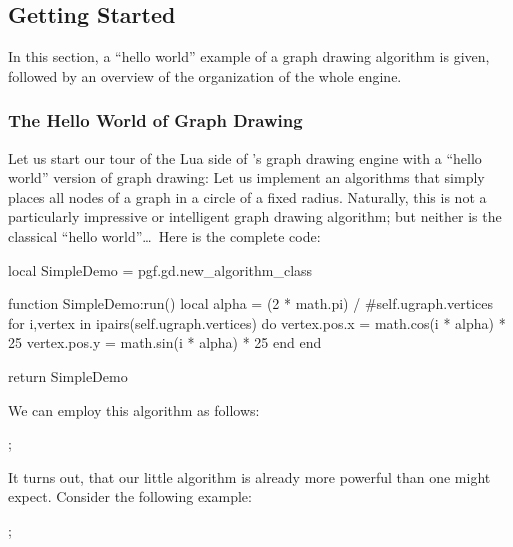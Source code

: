 \subsection{Getting Started}

In this section, a ``hello world'' example of a graph
drawing algorithm  is given, followed by an overview of the
organization of the whole engine.



\subsubsection{The Hello World of Graph Drawing}

Let us start our tour of the Lua side of \tikzname's graph drawing
engine with a ``hello world'' version of graph drawing: Let us
implement an algorithms that simply places all nodes of a graph in a
circle of a fixed radius. Naturally, this is not a particularly
impressive or intelligent graph drawing algorithm; but neither is the
classical ``hello world''\dots\ Here is the complete code:

\begin{codeexample}
local SimpleDemo = pgf.gd.new_algorithm_class {}

function SimpleDemo:run()
  local alpha = (2 * math.pi) / #self.ugraph.vertices
  for i,vertex in ipairs(self.ugraph.vertices) do
    vertex.pos.x = math.cos(i * alpha) * 25
    vertex.pos.y = math.sin(i * alpha) * 25
  end
end

return SimpleDemo  
\end{codeexample}

We can employ this algorithm as follows:

\begin{codeexample}[pre={
    \pgfkeys{
      /graph drawing/radius=25,
      /graph drawing/algorithm/.code={\pgfgdgraphparameter{/graph drawing/algorithm}{"pgf.gd.examples.##1"}}}}]
\tikz [graph drawing scope, /graph drawing/algorithm=SimpleDemo]
  ;
\end{codeexample}

It turns out, that our little algorithm is already more powerful than
one might expect. Consider the following example:
\begin{codeexample}[pre={
    \pgfkeys{
      /graph drawing/radius=25,
      /graph drawing/algorithm/.code={\pgfgdgraphparameter{/graph drawing/algorithm}{"pgf.gd.examples.##1"}}}}]
\tikz [graph drawing scope, /graph drawing/algorithm=SimpleDemo, componentwise]
  ;
\end{codeexample}

